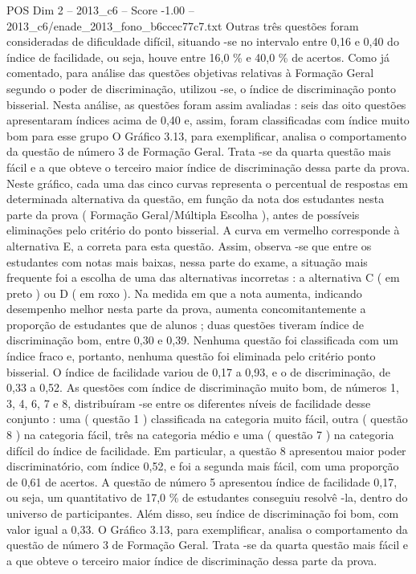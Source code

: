 \begin{textsample}{POS Dim 2 – 2013\_c6 – Score -1.00 – 2013\_c6/enade\_2013\_fono\_b6ccec77c7.txt}
Outras três questões foram consideradas de dificuldade difícil, situando -se no intervalo entre 0,16 e 0,40 do índice de facilidade, ou seja, houve entre 16,0 \% e 40,0 \% de acertos.
Como já comentado, para análise das questões objetivas relativas à Formação Geral segundo o poder de discriminação, utilizou -se, o índice de discriminação ponto bisserial.
Nesta análise, as questões foram assim avaliadas : seis das oito questões apresentaram índices acima de 0,40 e, assim, foram classificadas com índice muito bom para esse grupo O Gráfico 3.13, para exemplificar, analisa o comportamento da questão de número 3 de Formação Geral.
Trata -se da quarta questão mais fácil e a que obteve o terceiro maior índice de discriminação dessa parte da prova.
Neste gráfico, cada uma das cinco curvas representa o percentual de respostas em determinada alternativa da questão, em função da nota dos estudantes nesta parte da prova ( Formação Geral/Múltipla Escolha ), antes de possíveis eliminações pelo critério do ponto bisserial.
A curva em vermelho corresponde à alternativa E, a correta para esta questão.
Assim, observa -se que entre os estudantes com notas mais baixas, nessa parte do exame, a situação mais frequente foi a escolha de uma das alternativas incorretas : a alternativa C ( em preto ) ou D ( em roxo ).
Na medida em que a nota aumenta, indicando desempenho melhor nesta parte da prova, aumenta concomitantemente a proporção de estudantes que de alunos ; duas questões tiveram índice de discriminação bom, entre 0,30 e 0,39.
Nenhuma questão foi classificada com um índice fraco e, portanto, nenhuma questão foi eliminada pelo critério ponto bisserial.
O índice de facilidade variou de 0,17 a 0,93, e o de discriminação, de 0,33 a 0,52.
As questões com índice de discriminação muito bom, de números 1, 3, 4, 6, 7 e 8, distribuíram -se entre os diferentes níveis de facilidade desse conjunto : uma ( questão 1 ) classificada na categoria muito fácil, outra ( questão 8 ) na categoria fácil, três na categoria médio e uma ( questão 7 ) na categoria difícil do índice de facilidade.
Em particular, a questão 8 apresentou maior poder discriminatório, com índice 0,52, e foi a segunda mais fácil, com uma proporção de 0,61 de acertos.
A questão de número 5 apresentou índice de facilidade 0,17, ou seja, um quantitativo de 17,0 \% de estudantes conseguiu resolvê -la, dentro do universo de participantes.
Além disso, seu índice de discriminação foi bom, com valor igual a 0,33.
O Gráfico 3.13, para exemplificar, analisa o comportamento da questão de número 3 de Formação Geral.
Trata -se da quarta questão mais fácil e a que obteve o terceiro maior índice de discriminação dessa parte da prova.

\end{textsample}
